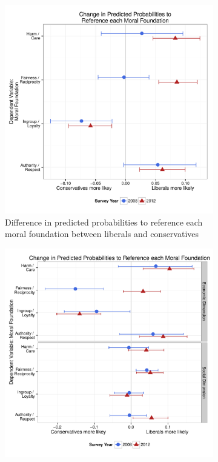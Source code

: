 \documentclass[12pt]{article}
\begin{document}
\begin{figure}[h]
  \centering
  \caption{INSERT DESCRIPTION}
  \begin{subfigure}[t]{0.49\textwidth}
    \includegraphics[scale=.35]{../calc/fig/appD1ideol.pdf}
    \caption{Difference in predicted probabilities to reference each moral foundation between liberals and conservatives}\label{fig:appD1ideol}
  \end{subfigure}
  \begin{subfigure}[t]{0.49\textwidth}
    \includegraphics[scale=.35]{../calc/fig/appD2soceco.pdf}

\end{subfigure}
\end{figure}
\end{document}
